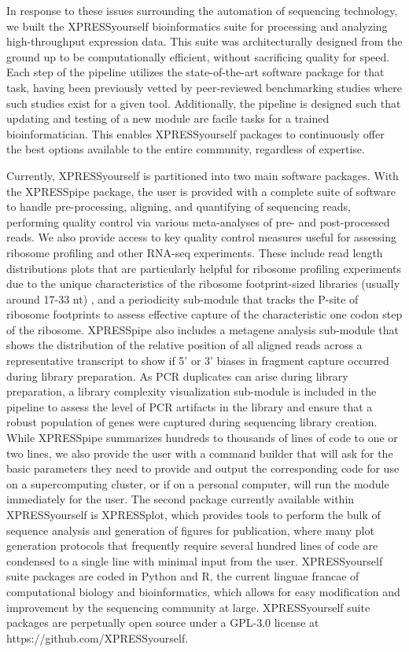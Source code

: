 \documentclass[11pt, a4paper, oneside]{article}
\begin{document}
In response to these issues surrounding the automation of sequencing technology, we built the XPRESSyourself bioinformatics suite for processing and analyzing high-throughput expression data. This suite was architecturally designed from the ground up to be computationally efficient, without sacrificing quality for speed. Each step of the pipeline utilizes the state-of-the-art software package for that task, having been previously vetted by peer-reviewed benchmarking studies where such studies exist for a given tool. Additionally, the pipeline is designed such that updating and testing of a new module are facile tasks for a trained bioinformatician. This enables XPRESSyourself packages to continuously offer the best options available to the entire community, regardless of expertise. \par

Currently, XPRESSyourself is partitioned into two main software packages. With the XPRESSpipe package, the user is provided with a complete suite of software to handle pre-processing, aligning, and quantifying of sequencing reads, performing quality control via various meta-analyses of pre- and post-processed reads. We also provide access to key quality control measures useful for assessing ribosome profiling and other RNA-seq experiments. These include read length distributions plots that are particularly helpful for ribosome profiling experiments due to the unique characteristics of the ribosome footprint-sized libraries (usually around 17-33 nt) \cite{fp_range}, and a periodicity sub-module that tracks the P-site of ribosome footprints to assess effective capture of the characteristic one codon step of the ribosome. XPRESSpipe also includes a metagene analysis sub-module that shows the distribution of the relative position of all aligned reads across a representative transcript to show if 5' or 3' biases in fragment capture occurred during library preparation. As PCR duplicates can arise during library preparation, a library complexity visualization sub-module is included in the pipeline to assess the level of PCR artifacts in the library and ensure that a robust population of genes were captured during sequencing library creation. While XPRESSpipe summarizes hundreds to thousands of lines of code to one or two lines, we also provide the user with a command builder that will ask for the basic parameters they need to provide and output the corresponding code for use on a supercomputing cluster, or if on a personal computer, will run the module immediately for the user. The second package currently available within XPRESSyourself is XPRESSplot, which provides tools to perform the bulk of sequence analysis and generation of figures for publication, where many plot generation protocols that frequently require several hundred lines of code are condensed to a single line with minimal input from the user. XPRESSyourself suite packages are coded in Python and R, the current linguae francae of computational biology and bioinformatics, which allows for easy modification and improvement by the sequencing community at large. XPRESSyourself suite packages are perpetually open source under a GPL-3.0 license at https://github.com/XPRESSyourself.
\end{document}
